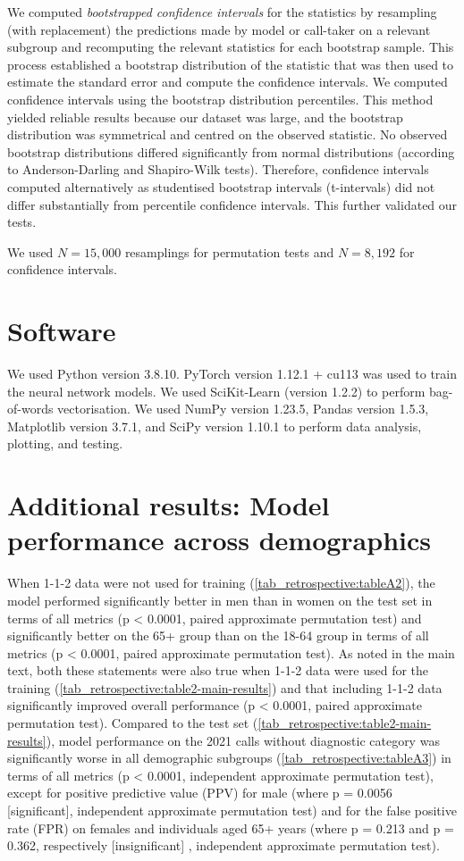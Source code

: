 {We computed \emph{bootstrapped confidence intervals} for the statistics by resampling (with replacement) the predictions made by model or call-taker on a relevant subgroup and recomputing the relevant statistics for each bootstrap sample. This process established a bootstrap distribution of the statistic that was then used to estimate the standard error and compute the confidence intervals. We computed confidence intervals using the bootstrap distribution percentiles. This method yielded reliable results because our dataset was large, and the bootstrap distribution was symmetrical and centred on the observed statistic. No observed bootstrap distributions differed significantly from normal distributions (according to Anderson-Darling and Shapiro-Wilk tests). Therefore, confidence intervals computed alternatively as studentised bootstrap intervals (t-intervals) did not differ substantially from percentile confidence intervals. This further validated our tests.

We used $N=15,000$ resamplings for permutation tests and $N=8,192$ for confidence intervals.


\section{Software}

We used Python version 3.8.10. PyTorch version 1.12.1 + cu113 was used to train the neural network models. We used SciKit-Learn (version 1.2.2) to perform bag-of-words vectorisation. We used NumPy version 1.23.5, Pandas version 1.5.3, Matplotlib version 3.7.1, and SciPy version 1.10.1 to perform data analysis, plotting, and testing.


\section{Additional results: Model performance across demographics}

When 1-1-2 data were not used for training (\cref{tab_retrospective:tableA2}), the model performed significantly better in men than in women on the test set in terms of all metrics (p < 0.0001, paired approximate permutation test) and significantly better on the 65+ group than on the 18-64 group in terms of all metrics (p < 0.0001, paired approximate permutation test). As noted in the main text, both these statements were also true when 1-1-2 data were used for the training (\cref{tab_retrospective:table2-main-results}) and that including 1-1-2 data significantly improved overall performance (p < 0.0001, paired approximate permutation test).
Compared to the test set (\cref{tab_retrospective:table2-main-results}), model performance on the 2021 calls without diagnostic category was significantly worse in all demographic subgroups (\cref{tab_retrospective:tableA3}) in terms of all metrics (p < 0.0001, independent approximate permutation test), except for positive predictive value (PPV) for male (where p = 0.0056 [significant], independent approximate permutation test) and for the false positive rate (FPR) on females and individuals aged 65+ years (where p = 0.213 and p = 0.362, respectively [insignificant] , independent approximate permutation test).


}
